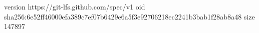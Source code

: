 version https://git-lfs.github.com/spec/v1
oid sha256:6e52ff46000efa389c7ef07b6429e6a5f3e92706218ec2241b3bab1f28ab8a48
size 147897
